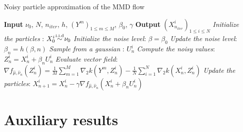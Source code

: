 \begin{algorithm}\label{subsec:pseudocode}
	\caption{Noisy particle approximation of the MMD flow}\label{euclid}
	\begin{algorithmic}[1]
		\State \textbf{Input} $\nu_0$, $N$, $n_{iter}$, $h$, $(Y^m)_{1 \le m \le M}$, $\beta_0$, $\gamma$
		\State \textbf{Output} $(X^{i}_{n_{iter}})_{1\le i\le N}$
		\State \textit{Initialize the particles} : $X_{0}^{i}\mysim \nu_0$
		\State \textit{Initialize the noise level}: $\beta=\beta_0$
		\State \textit{Update the noise level}: $\beta_n=h(\beta, n)$
		\State \textit{Sample from a gaussian }: $U_n^{i}$
		\State \textit{Compute the noisy values}: $Z_n^{i} = X_n^i+\beta_n U_n^i$
		\State \textit{Evaluate  vector field}:
		$\nabla f_{\hat{\mu},\hat{\nu}_n}(Z_n^{i}) = \frac{1}{M}\sum\limits_{m=1}^M \nabla_2 k(Y^m,Z_n^{i})-\frac{1}{N}\sum\limits_{i=1}^N \nabla_2 k(X_n^i,Z_n^{i})$
		\State \textit{Update the particles}: $X_{n+1}^{i} = X_n^i -\gamma \nabla f_{\hat{\mu},\hat{\nu}_n}(X_n^i+\beta_n U_n^i)$
		\EndFor
		\EndFor
	\end{algorithmic}
\end{algorithm}


\section{Auxiliary results}\label{sec:auxiliary_results}

